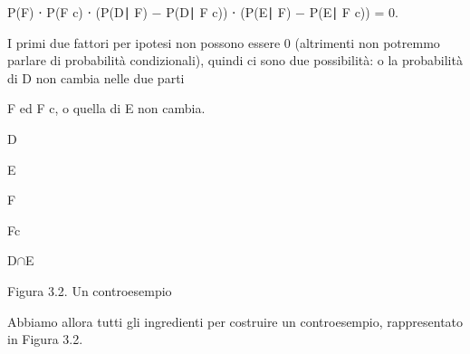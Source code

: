 \documentclass[a4paper,portrait,12pt]{article}
\begin{document}
\begin{flushleft}
P(F) ⋅ P(F c) ⋅ (P(D∣ F) $-$ P(D∣ F c)) ⋅ (P(E∣ F) $-$ P(E∣ F c)) = 0.
\end{flushleft}


\begin{flushleft}
I primi due fattori per ipotesi non possono essere 0 (altrimenti non potremmo parlare di probabilit\`{a} condizionali), quindi ci sono due possibilit\`{a}: o la probabilit\`{a} di D non cambia nelle due parti
\end{flushleft}


\begin{flushleft}
F ed F c, o quella di E non cambia.
\end{flushleft}





\begin{flushleft}
D
\end{flushleft}





\begin{flushleft}
E
\end{flushleft}





\begin{flushleft}
F
\end{flushleft}





\begin{flushleft}
Fc
\end{flushleft}





\begin{flushleft}
D$\cap$E
\end{flushleft}





\begin{flushleft}
Figura 3.2. Un controesempio
\end{flushleft}





\begin{flushleft}
Abbiamo allora tutti gli ingredienti per costruire un controesempio, rappresentato in Figura 3.2.
\end{flushleft}
\end{document}
